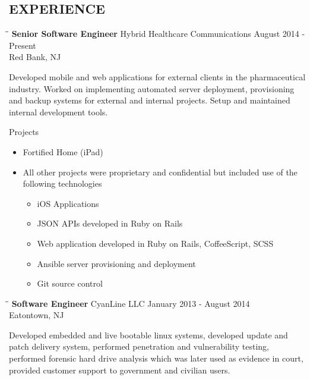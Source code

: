 \documentclass{res}
\begin{document}
\begin{resume}
\section{EXPERIENCE}
   \vspace{-0.1in}	
   \begin{tabbing}
   \hspacse{2.3in}\= \hspace{2.6in}\= \kill %
    {\bf Senior Software Engineer} \>Hybrid Healthcare Communications     \>August 2014 - Present\\
                             \>Red Bank, NJ
   \end{tabbing}\vspace{-20pt}      %
    Developed mobile and web applications for external clients in the pharmaceutical industry.
    Worked on implementing automated server deployment, provisioning and backup systems for external and internal projects.
    Setup and maintained internal development tools.

    Projects
    \begin{itemize}
        \item Fortified Home (iPad)
        \item All other projects were proprietary and confidential but included use of the following technologies
        \begin{itemize}
            \item iOS Applications
            \item JSON APIs developed in Ruby on Rails
            \item Web application developed in Ruby on Rails, CoffeeScript, SCSS
            \item Ansible server provisioning and deployment
            \item Git source control
        \end{itemize}
    \end{itemize}

   \begin{tabbing}
   \hspace{2.3in}\= \hspace{2.6in}\= \kill %
    {\bf Software Engineer} \>CyanLine LLC     \>January 2013 - August 2014\\
                             \>Eatontown, NJ
   \end{tabbing}\vspace{-20pt}      %
    Developed embedded and live bootable linux systems, 
    developed update and patch delivery system,
    performed penetration and vulnerability testing,
    performed forensic hard drive analysis which was later used as evidence in court,
    provided customer support to government and civilian users.


\end{resume}
\end{document}
